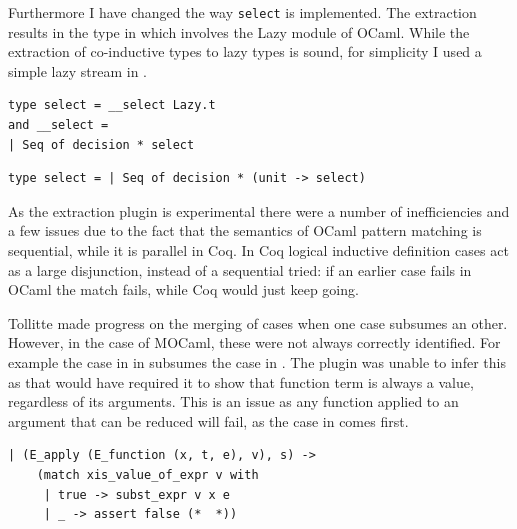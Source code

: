 \documentclass[12pt,twoside,notitlepage]{report}
\theoremstyle{plain}%
\theoremstyle{definition}
\theoremstyle{remark}
\begin{document}
Furthermore I have changed the way \verb|select| is implemented. The extraction results in the type in  which involves the Lazy module of OCaml. While the extraction of co-inductive types to lazy types is sound, for simplicity I used a simple lazy stream in . 


\vspace{3mm}
\begin{minipage}{\linewidth}

\begin{lstlisting}[caption={OCaml lazy select}, label={lst:ocamllazystar}]
type select = __select Lazy.t
and __select =
| Seq of decision * select
\end{lstlisting}

\end{minipage}

\begin{minipage}{\linewidth}

\begin{lstlisting}[caption={OCaml stream select}, label={lst:ocamlstreamstar}]
type select = | Seq of decision * (unit -> select) 
\end{lstlisting}

\end{minipage}

As the extraction plugin is experimental there were a number of inefficiencies and a few issues due to the fact that the semantics of OCaml pattern matching is sequential, while it is parallel in Coq. In Coq logical inductive definition cases act as a large disjunction, instead of a sequential tried: if an earlier case fails in OCaml the match fails, while Coq would just keep going.


Tollitte\cite{tollitte2012producing} made progress on the merging of cases when one case subsumes an other. However, in the case of MOCaml, these were not always correctly identified. For example the case in  in  subsumes the case in . The plugin was unable to infer this as that would have required it to show that function term is always a value, regardless of its arguments. This is an issue as any function applied to an argument that can be reduced will fail, as the case in  comes first.


\vspace{3mm}

\begin{minipage}{\linewidth}

\begin{lstlisting}[caption={OCaml original substitution case}, label={lst:ocamlorigsub}]
  | (E_apply (E_function (x, t, e), v), s) ->
    (match xis_value_of_expr v with
     | true -> subst_expr v x e
     | _ -> assert false (*  *))
\end{lstlisting}

\end{minipage}
\end{document}
